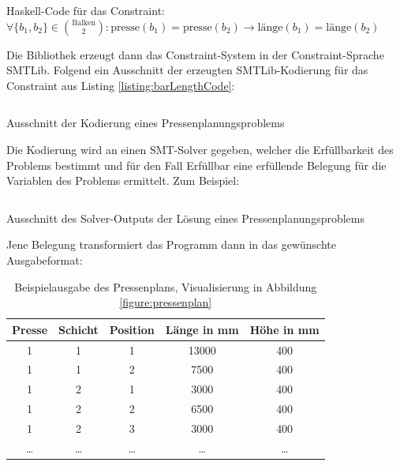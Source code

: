 \begin{listing}[H]
    \inputminted[linenos=true]{haskell}{Code/Einleitung/PressenlängeConstraintHaskell.hs}
    \caption{Haskell-Code für das Constraint: $ \forall \{b_1, b_2\} \in \binom{\text{Balken}}{2}: \text{presse}(b_1) = \text{presse}(b_2) \rightarrow \text{länge}(b_1) = \text{länge}(b_2) $}
    \label{listing:barLengthCode}
\end{listing}

Die Bibliothek erzeugt dann das Constraint-System in der Constraint-Sprache SMTLib.
Folgend ein Ausschnitt der erzeugten SMTLib-Kodierung für das Constraint aus Listing \ref{listing:barLengthCode}:

\begin{listing}[H]
    \inputminted[linenos=true]{bash}{Code/Einleitung/PressenlängeConstraintSMTLib.smt2}
    \caption{Ausschnitt der Kodierung eines Pressenplanungsproblems}
    \label{listing:barLengthSMTlib}
\end{listing}

Die Kodierung wird an einen SMT-Solver gegeben, welcher die Erfüllbarkeit des Problems bestimmt und für den Fall Erfüllbar eine erfüllende Belegung für die Variablen des Problems ermittelt.
Zum Beispiel:

\begin{listing}[H]
    \inputminted[linenos=true]{bash}{Code/Einleitung/PressenlängeConstraintSolverOutput.smt2}
    \caption{Ausschnitt des Solver-Outputs der Lösung eines Pressenplanungsproblems}
    \label{listing:barLengthSolverOutput}
\end{listing}

Jene Belegung transformiert das Programm dann in das gewünschte Ausgabeformat:

\begin{table}[H]
    \centering
    \begin{tabular}{|c|c|c|c|c|}
        \hline
        \textbf{Presse} & \textbf{Schicht} & \textbf{Position} & \textbf{Länge in mm} & \textbf{Höhe in mm} \\
        \hline
        1 & 1 & 1 & 13000 & 400 \\
        1 & 1 & 2 & 7500 & 400 \\
        1 & 2 & 1 & 3000 & 400 \\
        1 & 2 & 2 & 6500 & 400 \\
        1 & 2 & 3 & 3000 & 400 \\
        \ldots & \ldots & \ldots & \ldots & \ldots \\
        \hline
    \end{tabular}
    \caption{Beispielausgabe des Pressenplans, Visualisierung in Abbildung \ref{figure:pressenplan}}
    \label{table:pressenplan}
\end{table}

